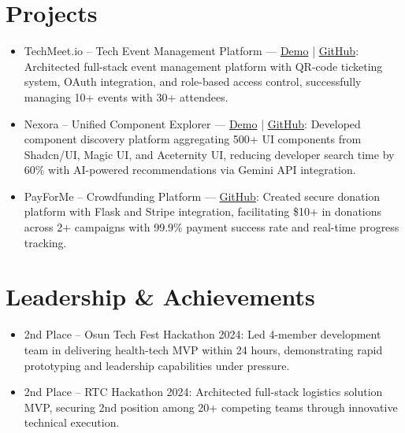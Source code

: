 \documentclass[letterpaper,11pt]{article}
\newcommand{\resumeItem}[1]{
  \item\small{
    {#1 \vspace{-2pt}}
  }
}
\newcommand{\resumeSubHeadingListStart}{\begin{itemize}[leftmargin=*]}
\newcommand{\resumeSubHeadingListEnd}{\end{itemize}}
\begin{document}
\section{Projects}
  \resumeSubHeadingListStart
    \resumeItem{TechMeet.io – Tech Event Management Platform — \href{https://tech-meet-io.vercel.app/}{Demo} | \href{https://github.com/Muhadev/TechMeet.io}{GitHub}: Architected full-stack event management platform with QR-code ticketing system, OAuth integration, and role-based access control, successfully managing 10+ events with 30+ attendees.}
    \resumeItem{Nexora – Unified Component Explorer — \href{https://ne-xora.vercel.app/}{Demo} | \href{https://github.com/Muhadev/Nexora}{GitHub}: Developed component discovery platform aggregating 500+ UI components from Shadcn/UI, Magic UI, and Aceternity UI, reducing developer search time by 60\% with AI-powered recommendations via Gemini API integration.}
    \resumeItem{PayForMe – Crowdfunding Platform — \href{https://github.com/Muhadev/PayForMe}{GitHub}: Created secure donation platform with Flask and Stripe integration, facilitating \$10+ in donations across 2+ campaigns with 99.9\% payment success rate and real-time progress tracking.}
  \resumeSubHeadingListEnd
  
\section{Leadership \& Achievements}
  \resumeSubHeadingListStart
    \resumeItem{2nd Place – Osun Tech Fest Hackathon 2024: Led 4-member development team in delivering health-tech MVP within 24 hours, demonstrating rapid prototyping and leadership capabilities under pressure.}
    \resumeItem{2nd Place – RTC Hackathon 2024: Architected full-stack logistics solution MVP, securing 2nd position among 20+ competing teams through innovative technical execution.}
  \resumeSubHeadingListEnd
\end{document}
